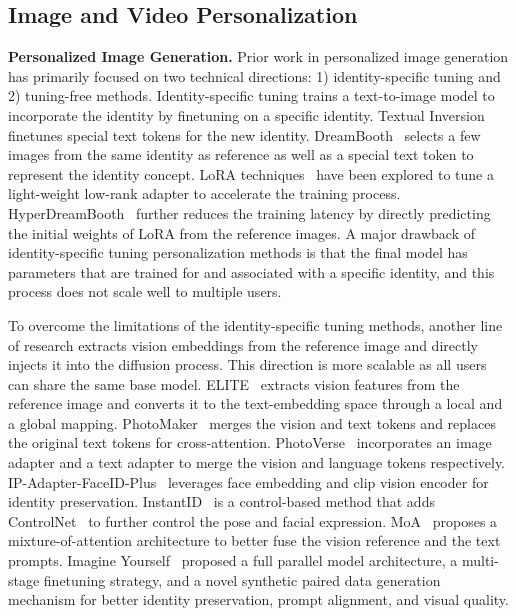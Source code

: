 \subsection{Image and Video Personalization}

\textbf{Personalized Image Generation.}
Prior work in personalized image generation has primarily focused on two technical directions: 1) identity-specific tuning and 2) tuning-free methods. Identity-specific tuning trains a text-to-image model to incorporate the identity by finetuning on a specific identity.
Textual Inversion~\citep{gal2022image} finetunes special text tokens for the new identity. DreamBooth~\citep{ruiz2023dreambooth} selects a few images from the same identity as reference as well as a special text token to represent the identity concept. LoRA techniques~\citep{hu2021lora} have been explored to tune a light-weight low-rank adapter
to accelerate the training process. HyperDreamBooth~\citep{ruiz2023hyperdreambooth} further reduces the training latency by directly predicting the initial weights of LoRA from the reference images. A major drawback of identity-specific tuning personalization methods is that the final model has parameters that are trained for and associated with a specific identity, and this process does not scale well to multiple users.

To overcome the limitations of the identity-specific tuning methods, another line of research extracts vision embeddings from the reference image and directly injects it into the diffusion process. This direction is more scalable as all users can share the same base model.
ELITE~\citep{wei2023elite} extracts vision features from the reference image and converts it to the text-embedding space through a local and a global mapping. PhotoMaker~\citep{li2023photomaker} merges the vision and text tokens and replaces the original text tokens for cross-attention.
PhotoVerse~\citep{chen2023photoverse} incorporates an image adapter and a text adapter to merge the vision and language tokens respectively. IP-Adapter-FaceID-Plus~\citep{ye2023ip} leverages face embedding and clip
vision encoder for identity preservation. InstantID~\citep{wang2024instantid} is a control-based method that adds ControlNet~\citep{zhang2023adding} to further control the pose and facial expression. MoA~\citep{ostashev2024moa} proposes a mixture-of-attention architecture to better fuse the vision reference and the text prompts. Imagine Yourself~\citep{meta24memu} proposed a full parallel model architecture,
a multi-stage finetuning strategy, and a novel synthetic paired data generation mechanism for better identity preservation, prompt alignment, and visual quality.


